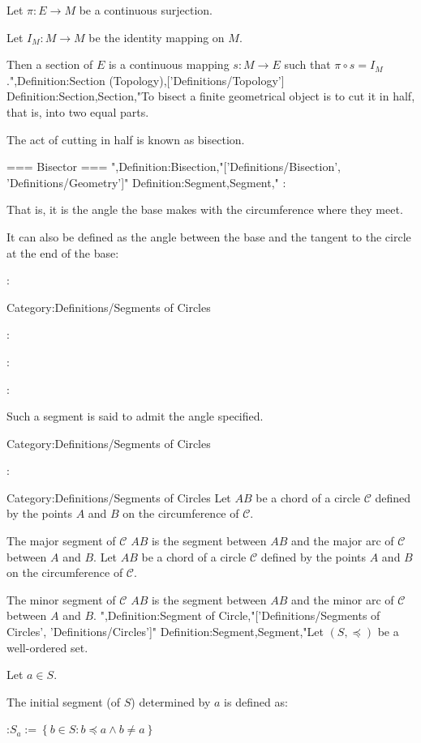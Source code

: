 Let $\pi: E \to M$ be a continuous surjection. 

Let $I_M: M \to M$ be the identity mapping on $M$. 


Then a section of $E$ is a continuous mapping $s: M \to E$ such that $\pi \circ s = I_M$.",Definition:Section (Topology),['Definitions/Topology']
Definition:Section,Section,"To bisect a finite geometrical object is to cut it in half, that is, into two equal parts.

The act of cutting in half is known as bisection.


=== Bisector ===
",Definition:Bisection,"['Definitions/Bisection', 'Definitions/Geometry']"
Definition:Segment,Segment,"
:

That is, it is the angle the base makes with the circumference where they meet.


It can also be defined as the angle between the base and the tangent to the circle at the end of the base:

:


Category:Definitions/Segments of Circles

:

:


:

Such a segment is said to admit the angle specified.


Category:Definitions/Segments of Circles

:



Category:Definitions/Segments of Circles
Let $AB$ be a chord of a circle $\mathcal C$ defined by the points $A$ and $B$ on the circumference of $\mathcal C$.

The major segment of $\mathcal C$  $AB$ is the segment between $AB$ and the major arc of $\mathcal C$ between $A$ and $B$.
Let $AB$ be a chord of a circle $\mathcal C$ defined by the points $A$ and $B$ on the circumference of $\mathcal C$.

The minor segment of $\mathcal C$  $AB$ is the segment between $AB$ and the minor arc of $\mathcal C$ between $A$ and $B$.
",Definition:Segment of Circle,"['Definitions/Segments of Circles', 'Definitions/Circles']"
Definition:Segment,Segment,"Let $\left( S, \preceq \right)$ be a well-ordered set.

Let $a \in S$.


The initial segment (of $S$) determined by $a$ is defined as:

:$S_a := \left\lbrace b \in S: b \preceq a \land b \ne a \right\rbrace$

